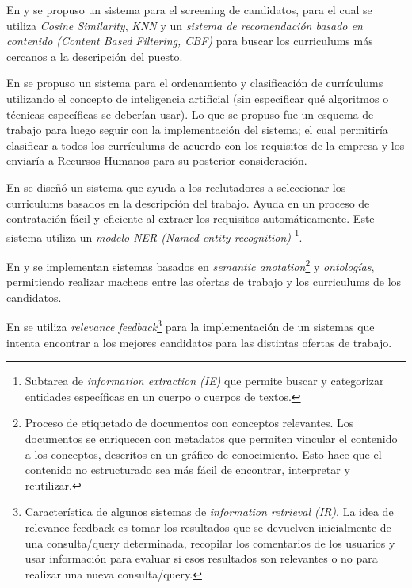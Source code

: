 \documentclass[12pt,a4paper]{article}
\begin{document}
\begin{sloppypar}
En \cite{trabajos_relacionados_7} y \cite{trabajos_relacionados_8} se propuso un sistema para el screening de candidatos, para el cual se utiliza \textit{Cosine Similarity}, \textit{KNN} y un \textit{sistema de recomendación basado en contenido (Content Based Filtering, CBF)} para buscar los curriculums más cercanos a la descripción del puesto.

En \cite{trabajos_relacionados_9} se propuso un sistema para el ordenamiento y clasificación de currículums utilizando el concepto de inteligencia artificial (sin especificar qué algoritmos o técnicas específicas se deberían usar). Lo que se propuso fue un esquema de trabajo para luego seguir con la implementación del sistema; el cual permitiría clasificar a todos los currículums de acuerdo con los requisitos de la empresa y los enviaría a Recursos Humanos para su posterior consideración.

En \cite{trabajos_relacionados_10} se diseñó un sistema que ayuda a los reclutadores a seleccionar los curriculums basados en la descripción del trabajo. Ayuda en un proceso de contratación fácil y eficiente al extraer los requisitos automáticamente. Este sistema utiliza un \textit{modelo NER (Named entity recognition)} \footnote{Subtarea de \textit{information extraction (IE)} que permite buscar y categorizar entidades específicas en un cuerpo o cuerpos de textos.}.

En \cite{trabajos_relacionados_11} y \cite{trabajos_relacionados_12} se implementan sistemas basados en \textit{semantic anotation}\footnote{Proceso de etiquetado de documentos con conceptos relevantes. Los documentos se enriquecen con metadatos que permiten vincular el contenido a los conceptos, descritos en un gráfico de conocimiento. Esto hace que el contenido no estructurado sea más fácil de encontrar, interpretar y reutilizar.} y \textit{ontologías}, permitiendo realizar macheos entre las ofertas de trabajo y los curriculums de los candidatos.

En \cite{trabajos_relacionados_13} se utiliza \textit{relevance feedback}\footnote{Característica de algunos sistemas de \textit{information retrieval (IR)}. La idea de relevance feedback es tomar los resultados que se devuelven inicialmente de una consulta/query determinada, recopilar los comentarios de los usuarios y usar información para evaluar si esos resultados son relevantes o no para realizar una nueva consulta/query.} para la implementación de un sistemas que intenta encontrar a los mejores candidatos para las distintas ofertas de trabajo.


\end{sloppypar}
\end{document}
